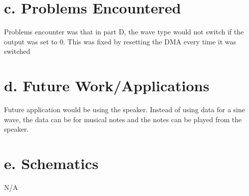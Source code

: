 \documentclass[11pt]{article}
\theoremstyle{plain}
\theoremstyle{definition}
\begin{document}
\section*{c. Problems Encountered} 
Problems encounter was that in part D, the wave type would not switch if the output was set to 0. This was fixed by resetting the DMA every time it was switched
%
%
\section*{d. Future Work/Applications}
Future application would be using the speaker. Instead of using data for a sine wave, the data can be for musical notes and the notes can be played from the speaker.
%
%
\section*{e. Schematics}
N/A
%
%
\newpage
\end{document}
